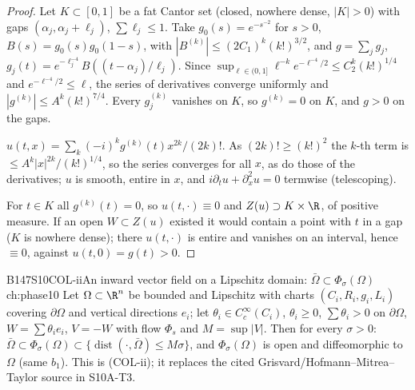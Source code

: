 \begin{proof}
Let $K\subset[0,1]$ be a fat Cantor set (closed, nowhere dense, $|K|>0$) with gaps $(\alpha_j,\alpha_j+\ell_j)$, $\sum\ell_j\le1$. Take $g_0(s)=e^{-s^{-2}}$ for $s>0$, $B(s)=g_0(s)g_0(1-s)$, with $|B^{(k)}|\le(2C_1)^k(k!)^{3/2}$, and $g=\sum_jg_j$, $g_j(t)=e^{-\ell_j^{-4}}B((t-\alpha_j)/\ell_j)$. Since $\sup_{\ell\in(0,1]}\ell^{-k}e^{-\ell^{-4}/2}\le C_2^k(k!)^{1/4}$ and $e^{-\ell^{-4}/2}\le\ell$, the series of derivatives converge uniformly and $|g^{(k)}|\le A^k(k!)^{7/4}$. Every $g_j^{(k)}$ vanishes on $K$, so $g^{(k)}=0$ on $K$, and $g>0$ on the gaps.

$u(t,x)=\sum_k(-i)^kg^{(k)}(t)x^{2k}/(2k)!$. As $(2k)!\ge(k!)^2$ the $k$-th term is $\le A^k|x|^{2k}/(k!)^{1/4}$, so the series converges for all $x$, as do those of the derivatives; $u$ is smooth, entire in $x$, and $i\partial_tu+\partial_x^2u=0$ termwise (telescoping).

For $t\in K$ all $g^{(k)}(t)=0$, so $u(t,\cdot)\equiv0$ and $Z(u)\supset K\times\R$, of positive measure. If an open $W\subset Z(u)$ existed it would contain a point with $t$ in a gap ($K$ is nowhere dense); there $u(t,\cdot)$ is entire and vanishes on an interval, hence $\equiv0$, against $u(t,0)=g(t)>0$.

\end{proof}

\begin{dimcard}{B147}{S10COL-ii}{An inward vector field on a Lipschitz domain: $\bar\Omega\subset\Phi_\sigma(\Omega)$}{\pw}{ch:phase10}
Let $\Omega\subset\R^n$ be bounded and Lipschitz with charts $(C_i,R_i,g_i,L_i)$ covering $\partial\Omega$ and vertical directions $e_i$; let $\theta_i\in C_c^\infty(C_i)$, $\theta_i\ge0$, $\sum\theta_i>0$ on $\partial\Omega$, $W=\sum\theta_ie_i$, $V=-W$ with flow $\Phi_s$ and $M=\sup|V|$. Then for every $\sigma>0$: $\bar\Omega\subset\Phi_\sigma(\Omega)\subset\{\operatorname{dist}(\cdot,\bar\Omega)\le M\sigma\}$, and $\Phi_\sigma(\Omega)$ is open and diffeomorphic to $\Omega$ (same $b_1$). This is (COL-ii); it replaces the cited Grisvard/Hofmann--Mitrea--Taylor source in S10A-T3.
\end{dimcard}

